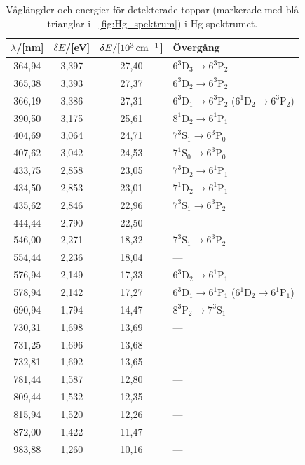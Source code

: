 \documentclass[11pt,a4paper]{article}
\newcommand{\figref}{\figurename~\ref}
\begin{document}
\begin{table}
\centering
\caption{Våglängder och energier för detekterade toppar (markerade med
  blå trianglar i \figref{fig:Hg_spektrum}) i Hg-spektrumet. } 
\label{tab:Hg_toppar}
\begin{tabular}{|c|c|c||l|}\hline
$\lambda$/[nm] & $\delta E$/[eV]  &$\delta E/[\unit[10^3]{cm^{-1}}$]
& Övergång\\ \hline
364,94  	& 3,397 	& 27,40
& $6^3\mathrm{D}_3\to 6^3\mathrm{P}_2$ 
\\ 
365,38  	& 3,393 	& 27,37 
& $6^3\mathrm{D}_2\to 6^3\mathrm{P}_2$ 
\\ 
366,19  	& 3,386 	& 27,31 
& $6^3\mathrm{D}_1\to 6^3\mathrm{P}_2$ 
  ($6^1\mathrm{D}_2\to 6^3\mathrm{P}_2$)
\\ 
390,50  	& 3,175 	& 25,61 
& $8^1\mathrm{D}_2\to 6^1\mathrm{P}_1$ %
\\ 
404,69  	& 3,064 	& 24,71 
& $7^3\mathrm{S}_1\to 6^3\mathrm{P}_0$ 
\\ 
407,62  	& 3,042 	& 24,53 
& $7^1\mathrm{S}_0\to 6^3\mathrm{P}_0$ 
\\ 
433,75  	& 2,858 	& 23,05 
& $7^3\mathrm{D}_2\to 6^1\mathrm{P}_1$ %
\\ 
434,50  	& 2,853 	& 23,01 
& $7^1\mathrm{D}_2\to 6^1\mathrm{P}_1$ %
\\ 
435,62  	& 2,846 	& 22,96 
& $7^3\mathrm{S}_1\to 6^3\mathrm{P}_2$ 
\\ 
444,44  	& 2,790 	& 22,50 
& --- 
\\ 
546,00  	& 2,271 	& 18,32 
& $7^3\mathrm{S}_1\to 6^3\mathrm{P}_2$ 
\\ 
554,44  	& 2,236 	& 18,04 
& ---
\\ 
576,94  	& 2,149 	& 17,33 
& $6^3\mathrm{D}_2\to 6^1\mathrm{P}_1$ 
\\ 
578,94  	& 2,142 	& 17,27 
& $6^3\mathrm{D}_1\to 6^1\mathrm{P}_1$ 
  ($6^1\mathrm{D}_2\to 6^1\mathrm{P}_1$) 
\\ 
690,94  	& 1,794 	& 14,47 
& $8^3\mathrm{P}_2\to 7^3\mathrm{S}_1$ 
\\ 
730,31  	& 1,698 	& 13,69 & --- \\ 
731,25  	& 1,696 	& 13,68 & --- \\ 
732,81  	& 1,692 	& 13,65 & --- \\ 
781,44  	& 1,587 	& 12,80 & --- \\ 
809,44  	& 1,532 	& 12,35 & --- \\ 
815,94  	& 1,520 	& 12,26 & --- \\ 
872,00  	& 1,422 	& 11,47 & --- \\ 
983,88  	& 1,260 	& 10,16 & --- \\ 
\hline
\end{tabular}
\end{table}



\newpage
{}

\end{document}
